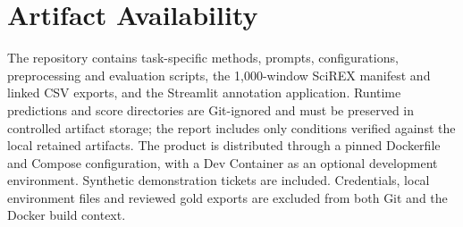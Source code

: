 \section*{Artifact Availability}
\small

The repository contains task-specific methods, prompts, configurations,
preprocessing and evaluation scripts, the 1{,}000-window SciREX manifest and
linked CSV exports, and the Streamlit annotation application. Runtime
predictions and score directories are Git-ignored and must be preserved in
controlled artifact storage; the report includes only conditions verified
against the local retained artifacts. The product is distributed through a
pinned Dockerfile and Compose configuration, with a Dev Container as an
optional development environment. Synthetic demonstration tickets are included.
Credentials, local environment files and reviewed gold exports are excluded
from both Git and the Docker build context.
